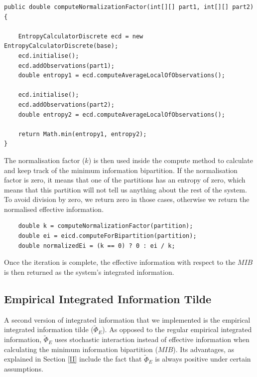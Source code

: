\documentclass[a4paper,11pt]{article}
\begin{document}
\begin{verbatim}
public double computeNormalizationFactor(int[][] part1, int[][] part2) {

	EntropyCalculatorDiscrete ecd = new EntropyCalculatorDiscrete(base);
	ecd.initialise();
	ecd.addObservations(part1);
	double entropy1 = ecd.computeAverageLocalOfObservations();

	ecd.initialise();
	ecd.addObservations(part2);
	double entropy2 = ecd.computeAverageLocalOfObservations();

	return Math.min(entropy1, entropy2);
}
\end{verbatim}

The normalisation factor ($k$) is then used inside the compute method to calculate and keep track of the minimum information bipartition. If the normalisation factor is zero, it means that one of the partitions has an entropy of zero, which means that this partition will not tell us anything about the rest of the system. To avoid division by zero, we return zero in those cases, otherwise we return the normalised effective information.

\begin{verbatim}
	double k = computeNormalizationFactor(partition);
	double ei = eicd.computeForBipartition(partition);
	double normalizedEi = (k == 0) ? 0 : ei / k;
\end{verbatim}

Once the iteration is complete, the effective information with respect to the $MIB$ is then returned as the system's integrated information. 

\subsection{Empirical Integrated Information Tilde}
\label{sec:impl:phi-e-tilde}

A second version of integrated information that we implemented is the empirical integrated information tilde ($\widetilde{\Phi}_{E}$). As opposed to the regular empirical integrated information, $\widetilde{\Phi}_{E}$ uses stochastic interaction instead of effective information when calculating the minimum information bipartition ($MIB$). Its advantages, as explained in Section \ref{II} include the fact that $\widetilde{\Phi}_{E}$ is always positive under certain assumptions.

\end{document}
